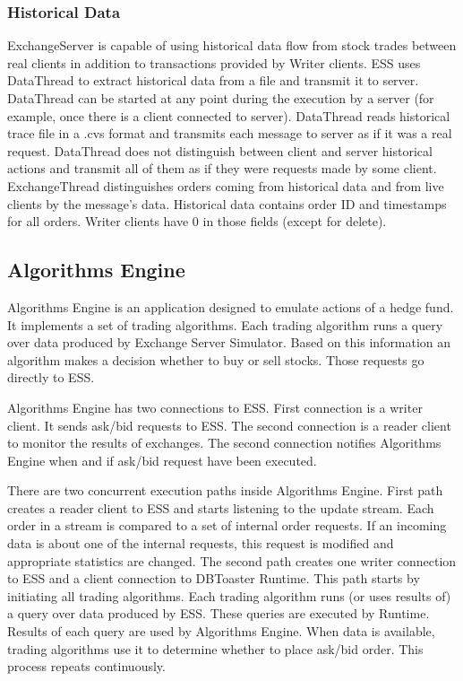 \documentclass[14pt]{article}
\begin{document}
\subsubsection{Historical Data}

ExchangeServer is capable of using historical data flow from stock trades
between real clients in addition to transactions provided by Writer clients. ESS
uses DataThread to extract historical data from a file and transmit it to
server. DataThread can be started at any point during the execution by a server
(for example, once there is a client connected to server). DataThread reads
historical trace file in a .cvs format and transmits each message to server as
if it was a real request. DataThread does not distinguish between client and
server historical actions and transmit all of them as if they were requests made
by some client. ExchangeThread distinguishes orders coming from historical data
and from live clients by the message's data. Historical data contains order ID
and timestamps for all orders. Writer clients have 0 in those fields (except for
delete).


\subsection{Algorithms Engine}

Algorithms Engine is an application designed to emulate actions of a hedge
fund. It implements a set of trading algorithms. Each trading algorithm runs a
query over data produced by Exchange Server Simulator. Based on this information
an algorithm makes a decision whether to buy or sell stocks. Those requests go
directly to ESS.

Algorithms Engine has two connections to ESS. First connection is a writer
client. It sends ask/bid requests to ESS. The second connection is a reader
client to monitor the results of exchanges. The second connection notifies
Algorithms Engine when and if ask/bid request have been executed.

There are two concurrent execution paths inside Algorithms Engine. First path
creates a reader client to ESS and starts listening to the update stream. Each
order in a stream is compared to a set of internal order requests. If an
incoming data is about one of the internal requests, this request is modified
and appropriate statistics are changed. The second path creates one writer
connection to ESS and a client connection to DBToaster Runtime. This path starts
by initiating all trading algorithms. Each trading algorithm runs (or uses
results of) a query over data produced by ESS. These queries are executed by
Runtime. Results of each query are used by Algorithms Engine. When data is
available, trading algorithms use it to determine whether to place ask/bid
order. This process repeats continuously.
\end{document}
